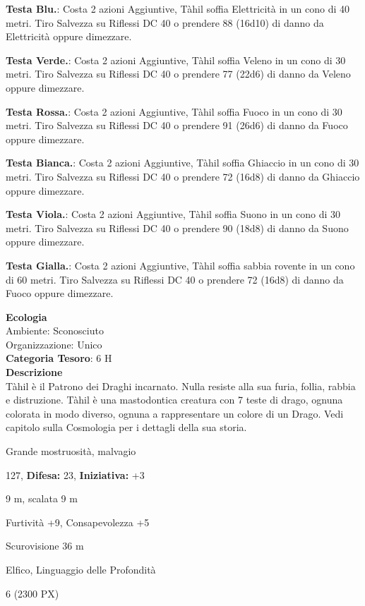 \begin{multicols}{2}
{\textbf{Testa Blu.}: Costa 2 azioni Aggiuntive, Tàhil soffia Elettricità in un cono di 40 metri. Tiro Salvezza su Riflessi DC 40 o prendere 88 (16d10) di danno da Elettricità oppure dimezzare.

\textbf{Testa Verde.}: Costa 2 azioni Aggiuntive, Tàhil soffia Veleno in un cono di 30 metri. Tiro Salvezza su Riflessi DC 40 o prendere 77 (22d6) di danno da Veleno oppure dimezzare.

\textbf{Testa Rossa.}: Costa 2 azioni Aggiuntive, Tàhil soffia Fuoco in un cono di 30 metri. Tiro Salvezza su Riflessi DC 40 o prendere 91 (26d6) di danno da Fuoco oppure dimezzare.

\textbf{Testa Bianca.}: Costa 2 azioni Aggiuntive, Tàhil soffia Ghiaccio in un cono di 30 metri. Tiro Salvezza su Riflessi DC 40 o prendere 72 (16d8) di danno da Ghiaccio oppure dimezzare.

\textbf{Testa Viola.}: Costa 2 azioni Aggiuntive, Tàhil soffia Suono in un cono di 30 metri. Tiro Salvezza su Riflessi DC 40 o prendere 90 (18d8) di danno da Suono oppure dimezzare.

\textbf{Testa Gialla.}: Costa 2 azioni Aggiuntive, Tàhil soffia sabbia rovente in un cono di 60 metri. Tiro Salvezza su Riflessi DC 40 o prendere 72 (16d8) di danno da Fuoco oppure dimezzare.

\textbf{Ecologia}\\
Ambiente: Sconosciuto\\
Organizzazione: Unico\\
\textbf{Categoria Tesoro}: 6 H\\
\textbf{Descrizione}\\
Tàhil è il Patrono dei Draghi incarnato. Nulla resiste alla sua furia, follia, rabbia e distruzione. Tàhil è una mastodontica creatura con 7 teste di drago, ognuna colorata in modo diverso, ognuna a rappresentare un colore di un Drago. Vedi capitolo sulla Cosmologia per i dettagli della sua storia.

\noindent
\begin{description}[noitemsep, topsep=0pt, parsep=0pt, partopsep=0pt, leftmargin=0cm, labelwidth=2.2cm]
	\item[\textbf{Taglia/Tipo:}] Grande mostruosità, malvagio
	\item[\textbf{Caratt.:}] 
	\item[\textbf{Punti Ferita:}] 127,  \textbf{Difesa:} 23,  \textbf{Iniziativa:} +3
	\item[\textbf{Movimento:}] 9 m, scalata 9 m
	\item[\textbf{Tiri Salvez.:}] 
	\item[\textbf{Comp.:}] Furtività +9, Consapevolezza +5
	\item[\textbf{Sensi:}] Scurovisione 36 m
	\item[\textbf{Linguaggi:}] Elfico, Linguaggio delle Profondità
	\item[\textbf{Sfida:}] 6 (2300 PX)\smallskip
\end{description}

}
\end{multicols}
